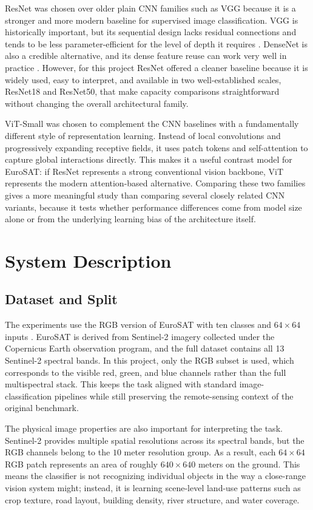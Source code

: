 \documentclass[11pt]{report}
\begin{document}
ResNet was chosen over older plain CNN families such as VGG because it is a stronger and more modern baseline for supervised image classification. VGG is historically important, but its sequential design lacks residual connections and tends to be less parameter-efficient for the level of depth it requires \cite{simonyan2015}. DenseNet is also a credible alternative, and its dense feature reuse can work very well in practice \cite{huang2017}. However, for this project ResNet offered a cleaner baseline because it is widely used, easy to interpret, and available in two well-established scales, ResNet18 and ResNet50, that make capacity comparisons straightforward without changing the overall architectural family.

ViT-Small was chosen to complement the CNN baselines with a fundamentally different style of representation learning. Instead of local convolutions and progressively expanding receptive fields, it uses patch tokens and self-attention to capture global interactions directly. This makes it a useful contrast model for EuroSAT: if ResNet represents a strong conventional vision backbone, ViT represents the modern attention-based alternative. Comparing these two families gives a more meaningful study than comparing several closely related CNN variants, because it tests whether performance differences come from model size alone or from the underlying learning bias of the architecture itself.

\chapter{System Description}
\section{Dataset and Split}
The experiments use the RGB version of EuroSAT with ten classes and \(64 \times 64\) inputs \cite{helber2019}. EuroSAT is derived from Sentinel-2 imagery collected under the Copernicus Earth observation program, and the full dataset contains all 13 Sentinel-2 spectral bands. In this project, only the RGB subset is used, which corresponds to the visible red, green, and blue channels rather than the full multispectral stack. This keeps the task aligned with standard image-classification pipelines while still preserving the remote-sensing context of the original benchmark.

The physical image properties are also important for interpreting the task. Sentinel-2 provides multiple spatial resolutions across its spectral bands, but the RGB channels belong to the \(10\) meter resolution group. As a result, each \(64 \times 64\) RGB patch represents an area of roughly \(640 \times 640\) meters on the ground. This means the classifier is not recognizing individual objects in the way a close-range vision system might; instead, it is learning scene-level land-use patterns such as crop texture, road layout, building density, river structure, and water coverage.
\end{document}
